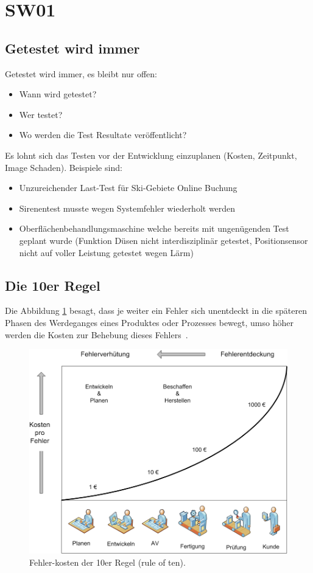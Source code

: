 \section{SW01}

\subsection{Getestet wird immer}
\label{subsec: Getestet wird immer}
Getestet wird immer, es bleibt nur offen:
\begin{itemize}
    \item Wann wird getestet?
    \item Wer testet?
    \item Wo werden die Test Resultate veröffentlicht?
\end{itemize}
Es lohnt sich das Testen vor der Entwicklung einzuplanen (Kosten, Zeitpunkt, Image Schaden).
Beispiele sind:
\begin{itemize}
    \item Unzureichender Last-Test für Ski-Gebiete Online Buchung
    \item Sirenentest musste wegen Systemfehler wiederholt werden 
    \item Oberflächenbehandlungsmaschine welche bereits mit ungenügenden Test geplant wurde (Funktion Düsen nicht interdisziplinär getestet, Positionsensor nicht auf voller Leistung getestet wegen Lärm)
\end{itemize}

\subsection{Die 10er Regel}

Die Abbildung \ref{fig:10er Regel} besagt, dass je weiter ein Fehler sich unentdeckt in die späteren Phasen des Werdeganges eines Produktes oder Prozesses bewegt, umso höher werden die Kosten zur Behebung dieses Fehlers~\cite{sixsigmablackbelt.de}.

\begin{figure}[H]
	\centering
	\includegraphics[width=1.0\columnwidth]{01/bilder/Fehlerkosten-10-er-Regel.png}
	\caption{Fehler-kosten der 10er Regel (rule of ten).}
	\label{fig:10er Regel}
\end{figure}

